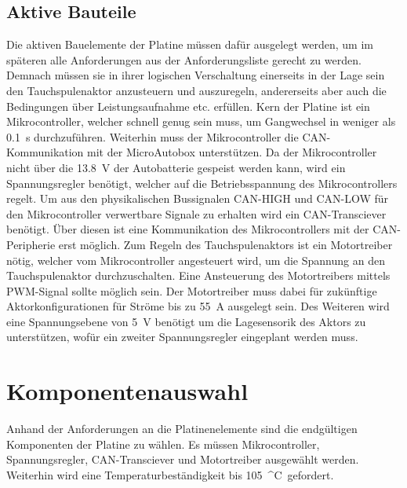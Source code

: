 \subsection{Aktive Bauteile}
Die aktiven Bauelemente der Platine müssen dafür ausgelegt werden, um im späteren alle Anforderungen aus der Anforderungsliste gerecht zu werden. Demnach müssen sie in ihrer logischen Verschaltung einerseits in der Lage sein den Tauchspulenaktor anzusteuern und auszuregeln, andererseits aber auch die Bedingungen über Leistungsaufnahme etc. erfüllen. Kern der Platine ist ein Mikrocontroller, welcher schnell genug sein muss, um Gangwechsel in weniger als \SI{0,1}{s} durchzuführen. Weiterhin muss der Mikrocontroller die CAN-Kommunikation mit der MicroAutobox unterstützen. Da der Mikrocontroller nicht über die \SI{13,8}{V} der Autobatterie gespeist werden kann, wird ein Spannungsregler benötigt, welcher auf die Betriebsspannung des Mikrocontrollers regelt. Um aus den physikalischen Bussignalen CAN-HIGH und CAN-LOW für den Mikrocontroller verwertbare Signale zu erhalten wird ein CAN-Transciever benötigt. Über diesen ist eine Kommunikation des Mikrocontrollers mit der CAN-Peripherie erst möglich. Zum Regeln des Tauchspulenaktors ist ein Motortreiber nötig, welcher vom Mikrocontroller angesteuert wird, um die Spannung an den Tauchspulenaktor durchzuschalten. Eine Ansteuerung des Motortreibers mittels PWM-Signal sollte möglich sein. Der Motortreiber muss dabei für zukünftige Aktorkonfigurationen für Ströme bis zu \SI{55}{A} ausgelegt sein. Des Weiteren wird eine Spannungsebene von \SI{5}{V} benötigt um die Lagesensorik des Aktors zu unterstützen, wofür ein zweiter Spannungsregler eingeplant werden muss.
\newpage
\section{Komponentenauswahl}
Anhand der Anforderungen an die Platinenelemente sind die endgültigen Komponenten der Platine zu wählen. Es müssen Mikrocontroller, Spannungsregler, CAN-Transciever und Motortreiber ausgewählt werden. Weiterhin wird eine Temperaturbeständigkeit bis \SI{105}{^\circ C} gefordert.

